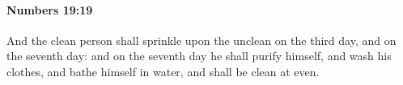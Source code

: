 
		\paragraph{Numbers 19:19} %
			\label{NUMBERS-19-19}

			And the clean person shall sprinkle upon the unclean on the third day, and on the seventh day: and on the seventh day he shall purify himself, and wash his clothes, and bathe himself in water, and shall be clean at even.


